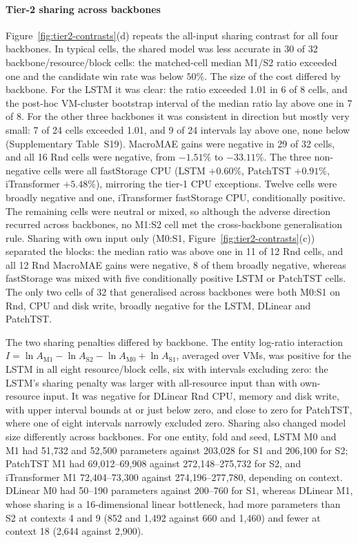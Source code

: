 \documentclass[5p,twocolumn]{elsarticle}
\begin{document}
\paragraph{Tier-2 sharing across backbones}
Figure~\ref{fig:tier2-contrasts}(d) repeats the all-input sharing contrast
for all four backbones. In typical cells, the shared model was less accurate
in 30 of 32 backbone/resource/block cells: the matched-cell median M1/S2
ratio exceeded one and the candidate win rate was below $50\%$. The size of
the cost differed by backbone. For the LSTM it was clear: the ratio exceeded
1.01 in 6 of 8 cells, and the post-hoc VM-cluster bootstrap interval of the
median ratio lay above one in 7 of 8. For the other three backbones it was
consistent in direction but mostly very small: 7 of 24 cells exceeded 1.01,
and 9 of 24 intervals lay above one, none below (Supplementary Table~S19).
MacroMAE
gains were negative in 29 of 32 cells, and all 16 Rnd cells were negative,
from $-1.51\%$ to $-33.11\%$. The three non-negative cells were
all fastStorage CPU (LSTM $+0.60\%$, PatchTST $+0.91\%$, iTransformer
$+5.48\%$), mirroring the tier-1 CPU exceptions. Twelve cells were broadly
negative and one, iTransformer fastStorage CPU, conditionally positive. The
remaining cells were neutral or mixed, so although the adverse direction
recurred across backbones, no M1:S2 cell met the cross-backbone
generalisation rule. Sharing with own input only (M0:S1,
Figure~\ref{fig:tier2-contrasts}(c)) separated the blocks: the median ratio
was above one in 11 of 12 Rnd cells, and all 12 Rnd MacroMAE gains were
negative, 8 of them broadly negative, whereas fastStorage was mixed with
five conditionally positive LSTM or PatchTST cells. The only two cells of
32 that generalised across backbones were both M0:S1 on Rnd, CPU and disk
write, broadly negative for the LSTM, DLinear and PatchTST.

The two sharing penalties differed by backbone. The entity log-ratio
interaction $I=\ln A_{\mathrm{M1}}-\ln A_{\mathrm{S2}}-\ln A_{\mathrm{M0}}
+\ln A_{\mathrm{S1}}$, averaged over VMs, was positive for the LSTM in all eight
resource/block cells, six with intervals excluding zero: the LSTM's sharing
penalty was larger with all-resource input than with own-resource input. It
was negative for DLinear Rnd CPU, memory and disk write, with upper interval
bounds at or just below zero, and close to zero for PatchTST, where one of
eight intervals narrowly excluded zero. Sharing also changed model size
differently across backbones. For one entity, fold and seed, LSTM M0 and M1
had 51{,}732 and 52{,}500 parameters against 203{,}028 for S1 and 206{,}100
for S2; PatchTST M1 had 69{,}012--69{,}908 against 272{,}148--275{,}732 for
S2, and iTransformer M1 72{,}404--73{,}300 against 274{,}196--277{,}780,
depending on context. DLinear M0 had 50--190 parameters against 200--760 for
S1, whereas DLinear M1, whose sharing is a 16-dimensional linear bottleneck,
had more parameters than S2 at contexts 4 and 9 (852 and 1{,}492 against 660
and 1{,}460) and fewer at context 18 (2{,}644 against 2{,}900).
\end{document}
